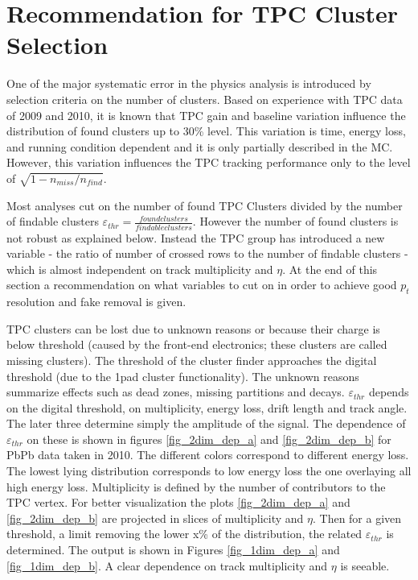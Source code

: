 \documentclass[12pt]{article}
\begin{document}
\section{Recommendation for TPC Cluster Selection}

One of the major systematic error in the physics analysis is introduced by selection criteria on the number of clusters. Based  on experience with TPC data of 2009 and 2010, it is known that TPC gain and baseline variation influence the distribution of found clusters up to  30\% level. This variation is time, energy loss, and running condition dependent and it is only partially described in the MC. However, this variation influences the TPC tracking performance only to the level of $\sqrt{1 - n_{miss}/n_{find}}$.


Most analyses cut on the number of found TPC Clusters divided by the number of findable clusters $\varepsilon_{thr} = \frac{found clusters}{findable clusters}$. However the number of found clusters is not robust as explained below.
Instead the TPC group has introduced a new variable - the ratio of number of crossed rows to the number of findable clusters - which is almost independent on track multiplicity and $\eta$. At the end of this section a recommendation on what variables to cut on in order to achieve good $p_{t}$ resolution and fake removal is given. \newline

\noindent TPC clusters can be lost due to unknown reasons or because their charge is below threshold (caused by the front-end electronics; these clusters are called missing clusters). The threshold of the cluster finder approaches the digital threshold (due to the 1pad cluster functionality). The unknown reasons summarize effects such as dead zones, missing partitions and decays.
$\varepsilon_{thr}$ depends on the digital threshold, on multiplicity, energy loss, drift length and track angle. The later three determine simply the amplitude of the signal. \newline
\noindent The dependence of $\varepsilon_{thr}$ on these is shown in figures \ref{fig_2dim_dep_a} and \ref{fig_2dim_dep_b} for PbPb data taken in 2010.
 The different colors correspond to different energy loss. The lowest lying distribution corresponds to low energy loss the one overlaying all high energy loss. Multiplicity is defined by the number of contributors to the TPC vertex.
For better visualization the plots \ref{fig_2dim_dep_a} and \ref{fig_2dim_dep_b} are projected in slices of multiplicity and $\eta$. Then for a given threshold, a limit removing the lower x\% of the distribution, the related $\varepsilon_{thr}$ is determined. The output is shown in Figures \ref{fig_1dim_dep_a} and \ref{fig_1dim_dep_b}. A clear dependence on track multiplicity and $\eta$ is seeable.
\end{document}
